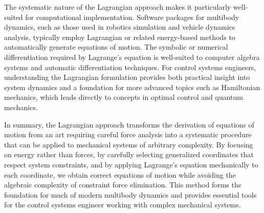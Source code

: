 The systematic nature of the Lagrangian approach makes it particularly well-suited for computational implementation. Software packages for multibody dynamics, such as those used in robotics simulation and vehicle dynamics analysis, typically employ Lagrangian or related energy-based methods to automatically generate equations of motion. The symbolic or numerical differentiation required by Lagrange's equation is well-suited to computer algebra systems and automatic differentiation techniques. For control systems engineers, understanding the Lagrangian formulation provides both practical insight into system dynamics and a foundation for more advanced topics such as Hamiltonian mechanics, which leads directly to concepts in optimal control and quantum mechanics.

In summary, the Lagrangian approach transforms the derivation of equations of motion from an art requiring careful force analysis into a systematic procedure that can be applied to mechanical systems of arbitrary complexity. By focusing on energy rather than forces, by carefully selecting generalized coordinates that respect system constraints, and by applying Lagrange's equation mechanically to each coordinate, we obtain correct equations of motion while avoiding the algebraic complexity of constraint force elimination. This method forms the foundation for much of modern multibody dynamics and provides essential tools for the control systems engineer working with complex mechanical systems.
